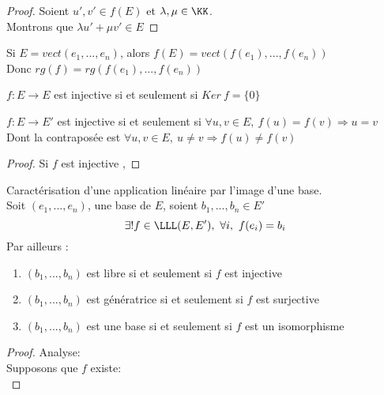 \documentclass[../main.tex]{subfile}
\begin{document}
\begin{proof}
	Soient $u', v' \in f(E)$ et $\lambda, \mu \in \KK$.\\
	Montrons que $\lambda u' + \mu v' \in E$
\end{proof}

\begin{rema}
	Si $E = vect(e_1, ..., e_n)$, 
	alors $f(E) = vect(f(e_1), ..., f(e_n))$\\
	Donc $rg(f) = rg(f(e_1), ..., f(e_n))$
\end{rema}

\begin{prop}
	$f: E \to E$ est injective si et seulement si $Ker \ f = \{0\}$\\
\end{prop}

\begin{rap}
	$f : E \to E'$ est injective si et seulement si $\forall u, v \in E, \ f(u) = f(v) \Rightarrow u = v$\\
	Dont la contraposée est $\forall u, v \in E, \ u \neq v \Rightarrow f(u) \neq f(v)$
\end{rap}

\begin{proof}
	Si $f$ est injective , %
\end{proof}

\begin{prop}
	Caractérisation d'une application linéaire par l'image d'une base.\\
	Soit $(e_1, ..., e_n)$, une base de $E$, soient $b_1, ..., b_n \in E'$\\
	$$\exists! f \in \LLL(E, E') , \ \forall i, \ f(e_i) = b_i$$
	Par ailleurs :
\begin{enumerate}	
	\item $(b_1, ..., b_n)$ est libre si et seulement si $f$ est injective
	\item $(b_1, ..., b_n)$ est génératrice si et seulement si $f$ est surjective
	\item $(b_1, ..., b_n)$ est une base si et seulement si $f$ est un isomorphisme
\end{enumerate}
\end{prop}

\begin{proof}
	Analyse:\\
	Supposons que $f$ existe:\\
\end{proof}
\end{document}
